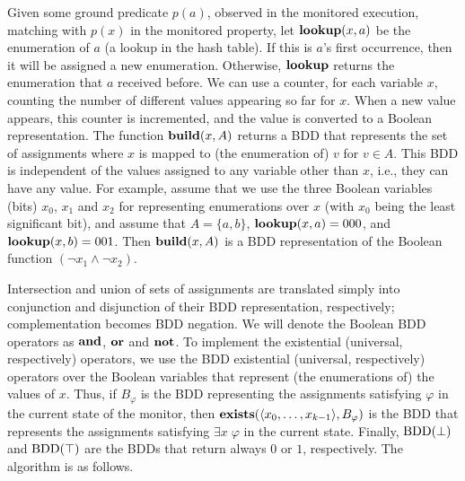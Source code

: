 Given some ground predicate $p ( a )$, observed in the monitored execution, 
matching with $p ( x )$ in the monitored property,
let $\mathbf{lookup} ( x, a )$ be the enumeration of $a$ (a lookup in the hash table). If this
is $a$'s first occurrence, then it will be assigned a new enumeration.
Otherwise, $\mathbf{lookup}$ returns the enumeration that $a$ received before. We can use a counter, for each variable $x$, counting the number of different values appearing so far for $x$. When a new value appears, this counter is incremented, and the value is converted to
a Boolean representation. 
%
The function $\mathbf{build} (x, A)$ returns
a BDD that represents the set of assignments where $x$ is mapped to 
(the enumeration of) $v$ for
$v \in A$. This BDD is independent
of the values assigned to any variable
other than $x$, i.e., they can have any value.
For example, assume that we use the three Boolean variables (bits) $x_0$, $x_1$ and $x_2$
for representing enumerations over $x$ (with $x_0$ being the least significant bit), and
assume that $A = \{ a , b \}$, 
$\mathbf{lookup} ( x, a ) = 000$, and $\mathbf{lookup} ( x , b ) = 001$.
Then $\mathbf{build} ( x , A )$ is a BDD representation of the Boolean function 
$(\neg x_1 \wedge \neg x_2)$. 

Intersection and union of sets of assignments are translated simply
into conjunction and disjunction of their BDD representation,
respectively; complementation
becomes BDD negation. We will denote
the Boolean BDD operators as $\mathbf{and}$, $\mathbf{or}$ and $\mathbf{not}$.
To implement the existential (universal, respectively) operators, 
we use the BDD existential (universal, respectively) operators over
the Boolean variables that represent (the enumerations of) the values of $x$. 
Thus, if $B_{\varphi}$ is the BDD representing
the assignments satisfying $\varphi$ in
the current state of the monitor, then 
$\mathbf{exists} (\langle x_0,\ldots,x_{k-1} \rangle, B_{\varphi})$
is the BDD that represents the assignments satisfying $\exists x \; \varphi$ in the current
state.
Finally, $\mathrm{BDD}(\bot)$ and $\mathrm{BDD}(\top)$  are the BDDs that return always
$0$ or $1$, respectively. The algorithm is as follows.

